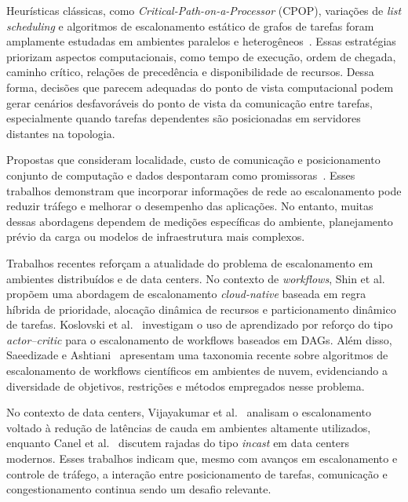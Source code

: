 \documentclass[12pt]{article}
\begin{document}
Heurísticas clássicas, como \textit{Critical-Path-on-a-Processor} (CPOP), variações de \textit{list scheduling} e algoritmos de escalonamento estático de grafos de tarefas foram amplamente estudadas em ambientes paralelos e heterogêneos~\cite{graham1979optimization,kwok1999static}. 
%
Essas estratégias priorizam aspectos computacionais, como tempo de execução, ordem de chegada, caminho crítico, relações de precedência e disponibilidade de recursos. 
%
Dessa forma, decisões que parecem adequadas do ponto de vista computacional podem gerar cenários desfavoráveis do ponto de vista da comunicação entre tarefas, especialmente quando tarefas dependentes são posicionadas em servidores distantes na topologia.

Propostas que consideram localidade, custo de comunicação e posicionamento conjunto de computação e dados despontaram como promissoras~\cite{jalaparti2015network}.
%
Esses trabalhos demonstram que incorporar informações de rede ao escalonamento pode reduzir tráfego e melhorar o desempenho das aplicações. 
%
No entanto, muitas dessas abordagens dependem de medições específicas do ambiente, planejamento prévio da carga ou modelos de infraestrutura mais complexos.

Trabalhos recentes reforçam a atualidade do problema de escalonamento em ambientes distribuídos e de data centers. 
%
No contexto de \textit{workflows}, Shin et al.~\cite{shin2024cloudnative} propõem uma abordagem de escalonamento \textit{cloud-native} baseada em regra híbrida de prioridade, alocação dinâmica de recursos e particionamento dinâmico de tarefas. 
%
Koslovski et al.~\cite{koslovski2024dag} investigam o uso de aprendizado por reforço do tipo \textit{actor--critic} para o escalonamento de workflows baseados em DAGs. 
%
Além disso, Saeedizade e Ashtiani~\cite{saeedizade2025scientific} apresentam uma taxonomia recente sobre algoritmos de escalonamento de workflows científicos em ambientes de nuvem, evidenciando a diversidade de objetivos, restrições e métodos empregados nesse problema.

No contexto de data centers, Vijayakumar et al.~\cite{vijayakumar2024reducedtail} analisam o escalonamento voltado à redução de latências de cauda em ambientes altamente utilizados, enquanto Canel et al.~\cite{canel2024understanding} discutem rajadas do tipo \textit{incast} em data centers modernos. 
%
Esses trabalhos indicam que, mesmo com avanços em escalonamento e controle de tráfego, a interação entre posicionamento de tarefas, comunicação e congestionamento continua sendo um desafio relevante.
\end{document}

